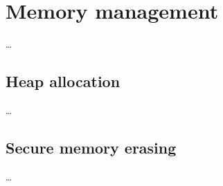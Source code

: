 \section{Memory management}\label{sec:memory}

\ldots

\subsection{Heap allocation}\label{subsec:alloc}

\ldots

\subsection{Secure memory erasing}\label{subsec:erasing}

\ldots
